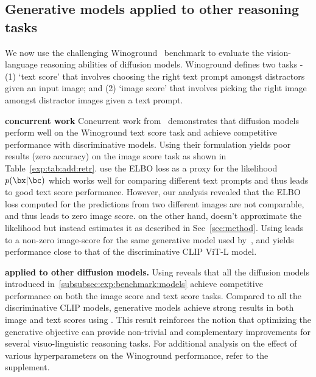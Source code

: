         







\subsection{Generative models applied to other reasoning tasks}\label{subsubsec:exp:abl:retrieval}

We now use the challenging Winoground~\cite{Thrush2022WinogroundPV} benchmark to evaluate the vision-language reasoning abilities of diffusion models.
Winoground defines two tasks - (1) `text score' that involves choosing the right text prompt amongst distractors given an input image; and (2) `image score' that involves picking the right image amongst distractor images given a text prompt.

\par \noindent \textbf{\OURS \vs concurrent work}
Concurrent work from~\cite{li2023diffusion} demonstrates that diffusion models perform well on the Winoground text score task and achieve competitive performance with discriminative models.
Using their formulation yields poor results (zero accuracy) on the image score task as shown in Table~\ref{exp:tab:add:retr}.
\cite{li2023diffusion} use the ELBO loss as a proxy for the likelihood $p(\bx | \bc)$ which works well for comparing different text prompts and thus leads to good text score performance.
However, our analysis revealed that the ELBO loss computed for the predictions from two different images are not comparable, and thus leads to zero image score.
\OURS on the other hand, doesn't approximate the likelihood but instead estimates it as described in Sec~\ref{sec:method}.
Using \OURS leads to a non-zero image-score for the same generative model used by~\cite{li2023diffusion}, and yields performance close to that of the discriminative CLIP ViT-L model.

\par \noindent \textbf{\OURS applied to other diffusion models.}
Using \OURS reveals that all the diffusion models introduced in~\cref{subsubsec:exp:benchmark:models} achieve competitive performance on both the image score and text score tasks.
Compared to all the discriminative CLIP models, generative models achieve strong results in both image and text scores using \OURS.
This result reinforces the notion that optimizing the generative objective can provide non-trivial and complementary improvements for several visuo-linguistic reasoning tasks.
 For additional analysis on the effect of various hyperparameters on the Winoground performance, refer to the supplement.

